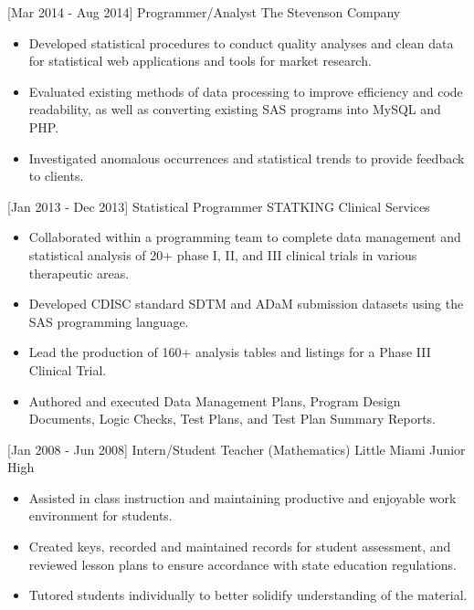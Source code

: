 \documentclass[]{moak-resume}
\begin{document}
\begin{entrylist}
  \entry
    {[Mar 2014 - Aug 2014]}
    {Programmer/Analyst}
    {The Stevenson Company}
    {}
\end{entrylist}
\begin{itemize}
  \setlength\itemsep{-0.4em}
  \item \small\bodyfont Developed statistical procedures to conduct quality analyses and clean data for statistical web applications and tools for market research. 
  \item \small\bodyfont Evaluated existing methods of data processing to improve efficiency and code readability, as well as converting existing SAS programs into MySQL and PHP.
  \item \small\bodyfont Investigated anomalous occurrences and statistical trends to provide feedback to clients.
  \newline
\end{itemize}

\begin{entrylist}
    \entry
    {[Jan 2013 - Dec 2013]}
    {Statistical Programmer}
    {STATKING Clinical Services}
    {}
  \end{entrylist}
\begin{itemize}
  \setlength\itemsep{-0.4em}
  \item \small\bodyfont Collaborated within a programming team to complete data management and statistical analysis of 20+ phase I, II, and III clinical trials in various therapeutic areas.
  \item \small\bodyfont Developed CDISC standard SDTM and ADaM submission datasets using the SAS programming language.
  \item \small\bodyfont Lead the production of 160+ analysis tables and listings for a Phase III Clinical Trial.
  \item \small\bodyfont Authored and executed Data Management Plans, Program Design Documents, Logic Checks, Test Plans, and Test Plan Summary Reports.
  \newline
\end{itemize}  

\begin{entrylist}
    \entry
    {[Jan 2008 - Jun 2008]}
    {Intern/Student Teacher (Mathematics)}
    {Little Miami Junior High}
    {}
\end{entrylist}
\begin{itemize}
  \setlength\itemsep{-0.4em}
  \item \small\bodyfont Assisted in class instruction and maintaining productive and enjoyable work environment for students.
  \item \small\bodyfont Created keys, recorded and maintained records for student assessment, and reviewed lesson plans to ensure accordance with state education regulations.
  \item \small\bodyfont Tutored students individually to better solidify understanding of the material.
  \newline
\end{itemize}  
\end{document}
